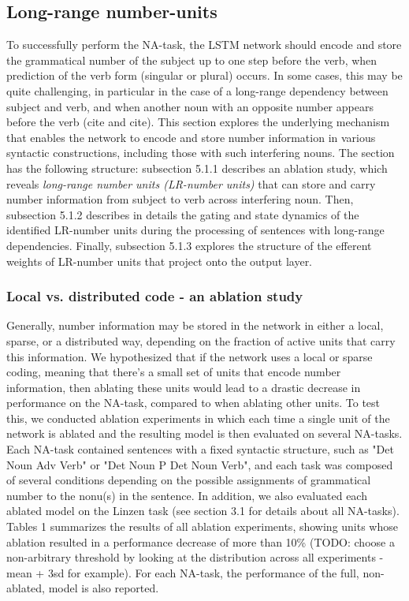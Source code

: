 \subsection{Long-range number-units}
To successfully perform the NA-task, the LSTM network should encode and store the grammatical number of the subject up to one step before the verb, when prediction of the verb form (singular or plural) occurs. In some cases, this may be quite challenging, in particular in the case of a long-range dependency between subject and verb, and when another noun with an opposite number appears before the verb (cite and cite). This section explores the underlying mechanism that enables the network to encode and store number information in various syntactic constructions, including those with such interfering nouns. The section has the following structure: subsection 5.1.1 describes an ablation study, which reveals \textit{long-range number units (LR-number units)} that can store and carry number information from subject to verb across interfering noun. Then, subsection 5.1.2 describes in details the gating and state dynamics of the identified LR-number units during the processing of sentences with long-range dependencies. Finally, subsection 5.1.3 explores the structure of the efferent weights of LR-number units that project onto the output layer.

\subsubsection{Local vs. distributed code - an ablation study}
Generally, number information may be stored in the network in either a local, sparse, or a distributed way, depending on the fraction of active units that carry this information. We hypothesized that if the network uses a local or sparse coding, meaning that there's a small set of units that encode number information, then ablating these units would lead to a drastic decrease in performance on the NA-task, compared to when ablating other units. To test this, we conducted ablation experiments in which each time a single unit of the network is ablated and the resulting model is then evaluated on several NA-tasks. Each NA-task contained sentences with a fixed syntactic structure, such as "Det Noun Adv Verb" or "Det Noun P Det Noun Verb", and each task was composed of several conditions depending on the possible assignments of grammatical number to the nonu(s) in the sentence. In addition, we also evaluated each ablated model on the Linzen task (see section 3.1 for details about all NA-tasks). Tables 1 summarizes the results of all ablation experiments, showing units whose ablation resulted in a performance decrease of more than 10\% (TODO: choose a non-arbitrary threshold by looking at the distribution across all experiments - mean + 3sd for example). For each NA-task, the performance of the full, non-ablated, model is also reported.


